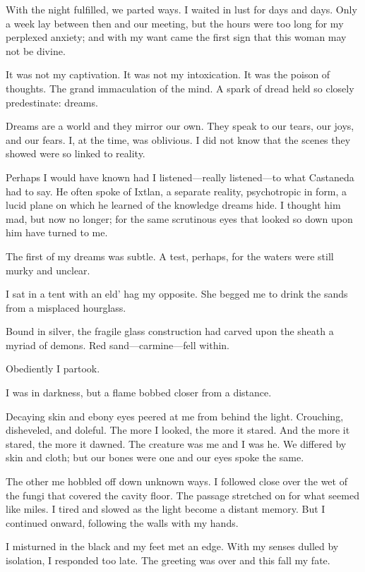 \documentclass{article}
\begin{document}
With the night fulfilled, we parted ways.
I waited in lust for days and days.
Only a week lay between then and our meeting,
but the hours were too long for my perplexed anxiety;
and with my want came the first sign that this woman may not be divine.


It was not my captivation.
It was not my intoxication.
It was the poison of thoughts.
The grand immaculation of the mind.
A spark of dread held so closely predestinate: dreams.
\VV


\noindent
Dreams are a world and they mirror our own.
They speak to our tears, our joys, and our fears.
I, at the time, was oblivious.
I did not know that the scenes they
showed were so linked to reality.


Perhaps I would have known had I listened---really listened---to
what Castaneda had to say.
He often spoke of Ixtlan,
a separate reality,
psychotropic in form,
a lucid plane on which he learned of the knowledge dreams hide.
I thought him mad, but now no longer;
for the same scrutinous eyes that looked so down upon him
have turned to me.
\VV


\noindent
The first of my dreams was subtle.
A test, perhaps, for the waters were still murky and unclear.
\vvvv


\noindent
I sat in a tent with an eld' hag my opposite.
She begged me to drink the sands from a misplaced hourglass.


Bound in silver, the fragile glass construction had
carved upon the sheath a myriad of demons.
Red sand---carmine---fell within.


Obediently I partook.


\noindent
I was in darkness, but a flame bobbed closer from a distance.


Decaying skin and ebony eyes peered at me from behind the light.
Crouching, disheveled, and doleful.
The more I looked, the more it stared.
And the more it stared, the more it dawned.
The creature was me and I was he.
We differed by skin and cloth; but our bones were one
and our eyes spoke the same.


The other me hobbled off down unknown ways.
I followed close over the wet of the fungi that
covered the cavity floor.
The passage stretched on for what seemed like miles.
I tired and slowed as the light become a distant memory.
But I continued onward, following the walls with my hands.


I misturned in the black and my feet met an edge.
With my senses dulled by isolation, I responded too late.
The greeting was over and this fall my fate.
\vvvv
\end{document}
